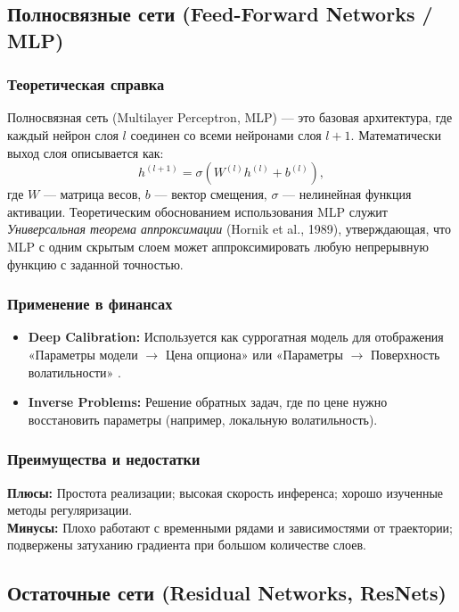 \documentclass[12pt, a4paper]{article}
\begin{document}
\subsection{Полносвязные сети (Feed-Forward Networks / MLP)}

\subsubsection{Теоретическая справка}
Полносвязная сеть (Multilayer Perceptron, MLP) — это базовая архитектура, где каждый нейрон слоя $l$ соединен со всеми нейронами слоя $l+1$. Математически выход слоя описывается как:
\begin{equation}
    h^{(l+1)} = \sigma \left( W^{(l)} h^{(l)} + b^{(l)} \right),
\end{equation}
где $W$ — матрица весов, $b$ — вектор смещения, $\sigma$ — нелинейная функция активации.
Теоретическим обоснованием использования MLP служит \textit{Универсальная теорема аппроксимации} (Hornik et al., 1989), утверждающая, что MLP с одним скрытым слоем может аппроксимировать любую непрерывную функцию с заданной точностью.

\subsubsection{Применение в финансах}
\begin{itemize}
    \item \textbf{Deep Calibration:} Используется как суррогатная модель для отображения «Параметры модели $\to$ Цена опциона» или «Параметры $\to$ Поверхность волатильности» \cite{Horvath2019}.
    \item \textbf{Inverse Problems:} Решение обратных задач, где по цене нужно восстановить параметры (например, локальную волатильность).
\end{itemize}

\subsubsection{Преимущества и недостатки}
\textbf{Плюсы:} Простота реализации; высокая скорость инференса; хорошо изученные методы регуляризации. \\
\textbf{Минусы:} Плохо работают с временными рядами и зависимостями от траектории; подвержены затуханию градиента при большом количестве слоев.

\subsection{Остаточные сети (Residual Networks, ResNets)}
\end{document}
